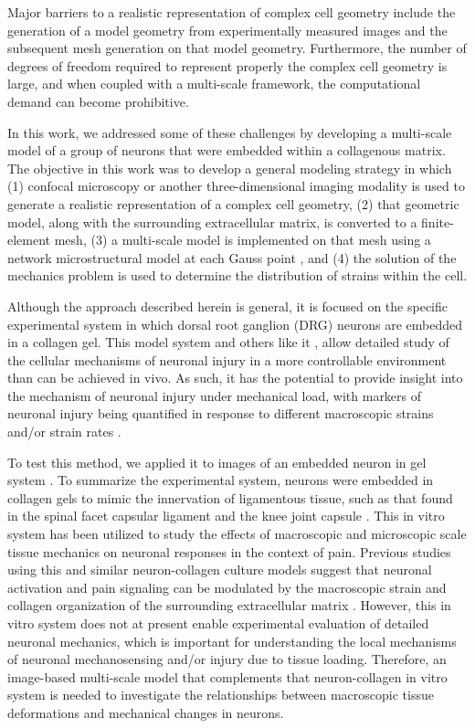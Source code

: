 \documentclass[]{interact}
\begin{document}
Major barriers to a realistic representation of complex cell geometry include the generation of a model geometry from experimentally measured images and the subsequent mesh generation on that model geometry. Furthermore, the number of degrees of freedom required to represent properly the complex cell geometry is large, and when coupled with a multi-scale framework, the computational demand can become prohibitive. 

In this work, we addressed some of these challenges by developing a multi-scale model of a group of neurons that were embedded within a collagenous matrix. The objective in this work was to develop a general modeling strategy in which (1) confocal microscopy or another three-dimensional imaging modality is used to generate a realistic representation of a complex cell geometry, (2) that geometric model, along with the surrounding extracellular matrix, is converted to a finite-element mesh, (3) a multi-scale model is implemented on that mesh using a network microstructural model at each Gauss point \citep{Chandran:2007hy,Stylianopoulos:2007dp}, and (4) the solution of the mechanics problem is used to determine the distribution of strains within the cell. 

Although the approach described herein is general, it is focused on the specific experimental system in which dorsal root ganglion (DRG) neurons are embedded in a collagen gel. This model system and others like it  \citep{Zhang:2016ga,Zhang:2017gr,Zhang:2017kq}, allow detailed study of the cellular mechanisms of neuronal injury in a more controllable environment than can be achieved in vivo. As such, it has the potential to provide insight into the mechanism of neuronal injury under mechanical load, with markers of neuronal injury being quantified in response to different macroscopic strains and/or strain rates \citep{Zhang:2016ga}. 

To test this method, we applied it to images of an embedded neuron in gel system \citep{Zhang:2016ga}. To summarize the experimental system, neurons were embedded in collagen gels to mimic the innervation of ligamentous tissue, such as that found in the spinal facet capsular ligament \citep{McLain1998RF,Kallakuri:2012ib} and the knee joint capsule \citep{Schultz1984RA,Khalsa:CKPnLlfY}. This in vitro system has been utilized to study the effects of macroscopic and microscopic scale tissue mechanics on neuronal responses in the context of pain. Previous studies using this and similar neuron-collagen culture models suggest that neuronal activation and pain signaling can be modulated by the macroscopic strain and collagen organization of the surrounding extracellular matrix \citep{Zhang:2016ga, Zhang:2017gr}. However, this in vitro system does not at present enable experimental evaluation of detailed neuronal mechanics, which is important for understanding the local mechanisms of neuronal mechanosensing and/or injury due to tissue loading. Therefore, an image-based multi-scale model that complements that neuron-collagen in vitro system is needed to investigate the relationships between macroscopic tissue deformations and mechanical changes in neurons. 
\end{document}
